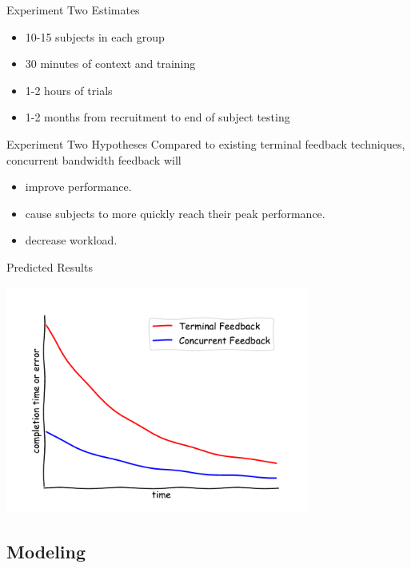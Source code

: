 \documentclass[10pt]{beamer}
\begin{document}
\begin{frame}[fragile]{Experiment Two Estimates}
  \begin{itemize}
    \setlength\itemsep{1em}
    \item 10-15 subjects in each group
    \item 30 minutes of context and training
    \item 1-2 hours of trials
    \item 1-2 months from recruitment to end of subject testing
  \end{itemize}
\end{frame}

\begin{frame}[fragile]{Experiment Two Hypotheses}
Compared to existing terminal feedback techniques, concurrent bandwidth feedback will
  \begin{itemize}
  \item improve performance.
  \item cause subjects to more quickly reach their peak performance.
  \item decrease workload.
  \end{itemize}
\end{frame}

\begin{frame}[fragile]{Predicted Results}
  \begin{center}
    \includegraphics[width=0.75\textwidth]{../img/robot_estimate.pdf}
  \end{center}
\end{frame}

\subsection{Modeling}
\end{document}
